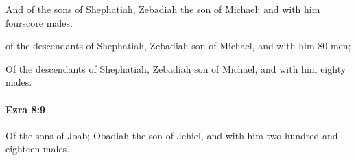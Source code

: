 			\begin{versebox}
					\item[BHS] 
					\item[LXX] 
					\item[ASV] And of the sons of Shephatiah, Zebadiah the son of Michael; and with him fourscore males.
					\item[NIV] of the descendants of Shephatiah, Zebadiah son of Michael, and with him 80 men;
					\item[NRSV] Of the descendants of Shephatiah, Zebadiah son of Michael, and with him eighty males.
			\end{versebox}

		\paragraph{Ezra 8:9} %
			\label{EZRA-8-9}

			Of the sons of Joab; Obadiah the son of Jehiel, and with him two hundred and eighteen males.

